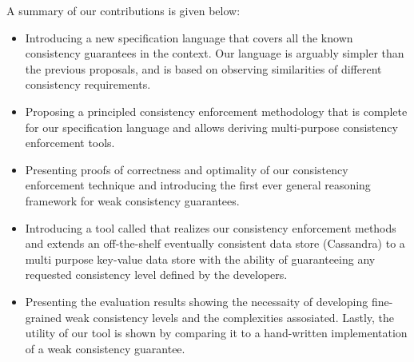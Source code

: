 A summary of our contributions is given below:
\begin{itemize}
\item Introducing a new specification language that covers all the known consistency guarantees in 
the context. Our language is arguably simpler than the previous proposals, and is based on observing 
similarities of different consistency requirements.

\item Proposing a principled consistency enforcement methodology that is 
complete for our specification language and allows deriving multi-purpose consistency enforcement 
tools.

\item Presenting proofs of correctness and optimality of our consistency enforcement technique
and introducing the first ever general reasoning framework for weak consistency guarantees. 

\item Introducing a tool called  \tool that realizes our consistency enforcement methods and 
extends an off-the-shelf eventually consistent data store (Cassandra) to a multi purpose key-value 
data store with the ability of guaranteeing any requested consistency level defined by the 
developers. 

\item Presenting the evaluation results showing the necessaity of
developing fine-grained weak consistency levels and the complexities
assosiated. Lastly, the utility of our tool is shown by comparing it to a hand-written
implementation of a weak consistency guarantee. 
\end{itemize}

